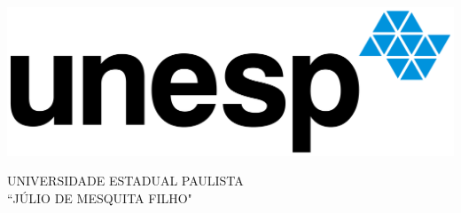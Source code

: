 
\thispagestyle{empty}

\begin{minipage}[c]{0.3\textwidth}
\includegraphics[width=\textwidth]{images/unesp.png}
\end{minipage}
\hspace{10pt}
\begin{minipage}[c]{0.6\textwidth}
\uppercase{Universidade Estadual Paulista \\``Júlio de Mesquita Filho"}
\end{minipage}

\vspace{1cm}

\begin{center}
    \nome
\end{center}

\vspace{5cm}

\begin{center}
    \titulo
\end{center}

\vspace*{\fill}

\begin{center}
    \uppercase{\cidadeestado\\\the\year{}}
\end{center}